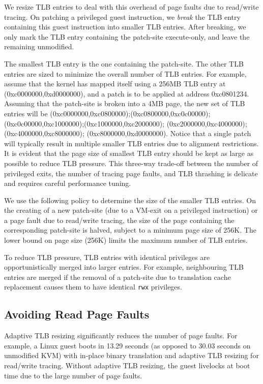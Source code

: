 \documentclass[10pt,twocolumn]{article}
\begin{document}
We resize TLB entries to deal with this overhead of page faults due to read/write
tracing. On patching a privileged guest instruction, we {\em break} the TLB entry
containing this guest instruction into smaller TLB entries. After breaking,
we only mark the
TLB entry containing the patch-site execute-only, and leave the remaining
unmodified.

The smallest TLB entry
is the one containing the patch-site. The other TLB entries are sized to minimize
the overall number of TLB entries. For example, assume that the kernel has mapped
itself using a 256MB TLB entry at (0xc0000000,0xd0000000), and a
patch is to be applied at address 0xc0801234. Assuming that the patch-site is broken
into a 4MB page, the new set of TLB entries will be
(0xc0000000,0xc0800000);(0xc0800000,0xc0c00000);
(0xc0c00000,0xc1000000);(0xc1000000,0xc2000000);
(0xc2000000,0xc4000000);(0xc4000000,0xc8000000);
(0xc8000000,0xd0000000). Notice that a single patch will typically result
in multiple smaller TLB entries due to alignment restrictions.
It is evident that the page size of smallest TLB entry should be kept as large
as possible to reduce
TLB pressure. This three-way trade-off between the number of
privileged exits, the number of tracing page faults, and TLB thrashing is
delicate and requires careful performance tuning.

We use the following policy to determine the size of the smaller TLB entries. On the
creating of a new patch-site (due to a VM-exit on a privileged instruction) or a
page fault due to read/write tracing,
the size of the page
containing the corresponding patch-site is halved, subject to
a minimum page size of 256K.
The lower bound on page size (256K) limits the maximum number of TLB entries.

To reduce TLB pressure, TLB entries with identical privileges are
opportunistically merged into
larger entries. For example, neighbouring TLB entries are merged if the
removal of a patch-site due to translation cache replacement causes
them to have identical {\tt rwx} privileges.

\subsection{Avoiding Read Page Faults}
Adaptive TLB resizing significantly reduces the number of page faults. For
example, a Linux guest boots in 13.29 seconds (as opposed to 30.03 seconds on
unmodified KVM) with in-place binary translation
and adaptive TLB resizing for read/write tracing. Without adaptive TLB resizing,
the guest livelocks at boot time due to the large number of
page faults.
\end{document}
